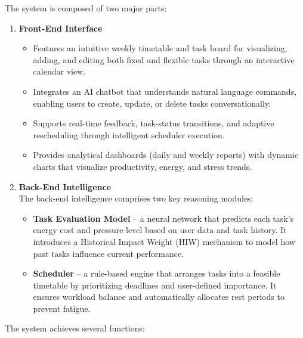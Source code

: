 \documentclass[12pt, a4paper]{article}
\begin{document}
    The system is composed of two major parts: 
    
    \begin{enumerate}
        \item \textbf{Front-End Interface}
            \begin{itemize}
                \item Features an intuitive weekly timetable and task board for visualizing, adding, and editing both fixed and flexible tasks through an interactive calendar view.
                \item Integrates an AI chatbot that understands natural language commands, enabling users to create, update, or delete tasks conversationally.
                \item Supports real-time feedback, task-status transitions, and adaptive rescheduling through intelligent scheduler execution.
                \item Provides analytical dashboards (daily and weekly reports) with dynamic charts that visualize productivity, energy, and stress trends.
            \end{itemize}
        
        \item \textbf{Back-End Intelligence} \\
            The back-end intelligence comprises two key reasoning modules:
            \begin{itemize}
                \item \textbf{Task Evaluation Model} – a neural network that predicts each task’s energy cost and pressure level based on user data and task history. It introduces a Historical Impact Weight (HIW) mechanism to model how past tasks influence current performance.
                \item \textbf{Scheduler} – a rule-based engine that arranges tasks into a feasible timetable by prioritizing deadlines and user-defined importance. It ensures workload balance and automatically allocates rest periods to prevent fatigue.
            \end{itemize}
    \end{enumerate}
    
    The system achieves several functions: 
    
\end{document}
